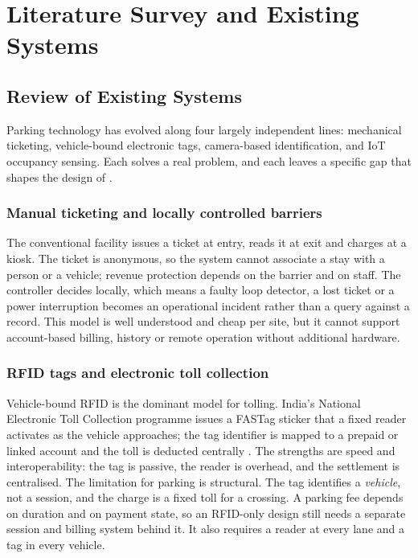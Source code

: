 \chapter{Literature Survey and Existing Systems}

\section{Review of Existing Systems}

Parking technology has evolved along four largely independent lines: mechanical
ticketing, vehicle-bound electronic tags, camera-based identification, and
IoT occupancy sensing. Each solves a real problem, and each leaves a specific gap
that shapes the design of \project{}.

\subsection{Manual ticketing and locally controlled barriers}

The conventional facility issues a ticket at entry, reads it at exit and charges at
a kiosk. The ticket is anonymous, so the system cannot associate a stay with a
person or a vehicle; revenue protection depends on the barrier and on staff. The
controller decides locally, which means a faulty loop detector, a lost ticket or a
power interruption becomes an operational incident rather than a query against a
record. This model is well understood and cheap per site, but it cannot support
account-based billing, history or remote operation without additional hardware.

\subsection{RFID tags and electronic toll collection}

Vehicle-bound RFID is the dominant model for tolling. India's National Electronic
Toll Collection programme issues a FASTag sticker that a fixed reader activates as
the vehicle approaches; the tag identifier is mapped to a prepaid or linked account
and the toll is deducted centrally \cite{npci2024}. The strengths are speed and
interoperability: the tag is passive, the reader is overhead, and the settlement is
centralised. The limitation for parking is structural. The tag identifies a
\emph{vehicle}, not a session, and the charge is a fixed toll for a crossing. A
parking fee depends on duration and on payment state, so an RFID-only design still
needs a separate session and billing system behind it. It also requires a reader at
every lane and a tag in every vehicle.

